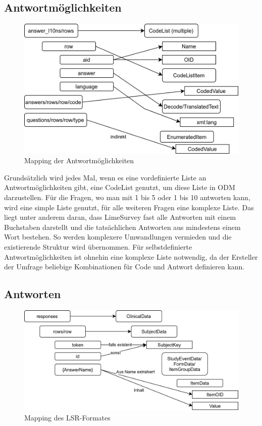 \subsection{Antwortmöglichkeiten}

\begin{figure}[h]
			\centering
			\includegraphics[width=.9\textwidth]{./img/m_answers.png}
			\caption{Mapping der Antwortmöglichkeiten}
\end{figure}

Grundsätzlich wird jedes Mal, wenn es eine vordefinierte Liste an Antwortmöglichkeiten gibt, eine CodeList genutzt, um diese Liste in ODM darzustellen.
Für die Fragen, wo man mit 1 bis 5 oder 1 bis 10 antworten kann, wird eine simple Liste genutzt, für alle weiteren Fragen eine komplexe Liste.
Das liegt unter anderem daran, dass LimeSurvey fast alle Antworten mit einem Buchstaben darstellt und die tatsächlichen Antworten aus mindestens einem Wort bestehen.
So werden komplexere Umwandlungen vermieden und die existierende Struktur wird übernommen.
Für selbstdefinierte Antwortmöglichkeiten ist ohnehin eine komplexe Liste notwendig, da der Ersteller der Umfrage beliebige Kombinationen für Code und Antwort definieren kann.

\subsection{Antworten}

\begin{figure}[h]
	\centering
	\includegraphics[width=1\textwidth]{./img/m_lsr.png}
	\caption{Mapping des LSR-Formates}
\end{figure}

